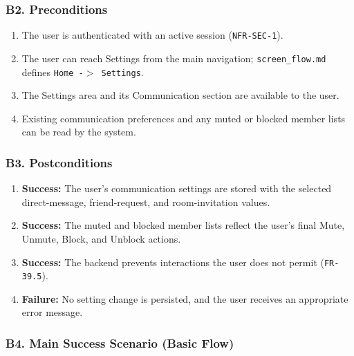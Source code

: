 \documentclass[12pt]{article}
\begin{document}
\hypertarget{sec:b2-preconditions}{}
\subsubsection*{B2. Preconditions}
\par\medskip

\begin{enumerate}
\item The user is authenticated with an active session (\texttt{NFR-SEC-1}).
\item The user can reach Settings from the main navigation; \texttt{screen\_flow.md} defines \texttt{Home -$>$ Settings}.
\item The Settings area and its Communication section are available to the user.
\item Existing communication preferences and any muted or blocked member lists can be read by the system.
\end{enumerate}
\par\medskip

\hypertarget{sec:b3-postconditions}{}
\subsubsection*{B3. Postconditions}
\par\medskip

\begin{enumerate}
\item \textbf{Success:} The user's communication settings are stored with the selected direct-message, friend-request, and room-invitation values.
\item \textbf{Success:} The muted and blocked member lists reflect the user's final Mute, Unmute, Block, and Unblock actions.
\item \textbf{Success:} The backend prevents interactions the user does not permit (\texttt{FR-39.5}).
\item \textbf{Failure:} No setting change is persisted, and the user receives an appropriate error message.
\end{enumerate}
\par\medskip

\hypertarget{sec:b4-main-success-scenario-basic-flow}{}
\subsubsection*{B4. Main Success Scenario (Basic Flow)}
\par\medskip
\end{document}
